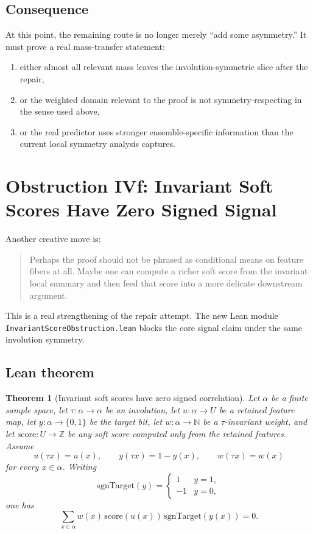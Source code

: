 \documentclass[11pt]{article}
\newtheorem{theorem}{Theorem}[section]
\theoremstyle{remark}
\begin{document}
\subsection{Consequence}

At this point, the remaining route is no longer merely ``add some asymmetry.''  It must prove a
real mass-transfer statement:
\begin{enumerate}[leftmargin=1.5em]
  \item either almost all relevant mass leaves the involution-symmetric slice after the repair,
  \item or the weighted domain relevant to the proof is not symmetry-respecting in the sense used
  above,
  \item or the real predictor uses stronger ensemble-specific information than the current local
  symmetry analysis captures.
\end{enumerate}

\section{Obstruction IVf: Invariant Soft Scores Have Zero Signed Signal}

Another creative move is:
\begin{quote}
Perhaps the proof should not be phrased as conditional means on feature fibers at all.  Maybe one
can compute a richer soft score from the invariant local summary and then feed that score into a
more delicate downstream argument.
\end{quote}

This is a real strengthening of the repair attempt.  The new Lean module
\texttt{InvariantScoreObstruction.lean} blocks the core signal claim under the same involution
symmetry.

\subsection{Lean theorem}

\begin{theorem}[Invariant soft scores have zero signed correlation]
Let \(\alpha\) be a finite sample space, let \(\tau : \alpha \to \alpha\) be an involution, let
\(u : \alpha \to U\) be a retained feature map, let \(y : \alpha \to \{0,1\}\) be the target bit,
let \(w : \alpha \to \mathbb{N}\) be a \(\tau\)-invariant weight, and let
\(\mathrm{score} : U \to \mathbb{Z}\) be any soft score computed only from the retained features.
Assume
\[
  u(\tau x) = u(x), \qquad y(\tau x) = 1-y(x), \qquad w(\tau x) = w(x)
\]
for every \(x \in \alpha\).  Writing
\[
  \mathrm{sgnTarget}(y) =
  \begin{cases}
    1 & y=1, \\
    -1 & y=0,
  \end{cases}
\]
one has
\[
  \sum_{x \in \alpha} w(x)\,\mathrm{score}(u(x))\,\mathrm{sgnTarget}(y(x)) = 0.
\]
\end{theorem}
\end{document}
